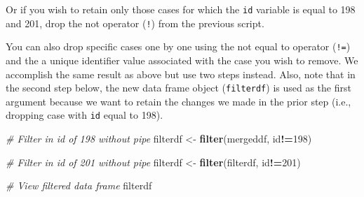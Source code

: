 \documentclass[]{book}
\newenvironment{Shaded}{\begin{snugshade}}{\end{snugshade}}
\newcommand{\KeywordTok}[1]{\textcolor[rgb]{0.13,0.29,0.53}{\textbf{#1}}}
\newcommand{\DecValTok}[1]{\textcolor[rgb]{0.00,0.00,0.81}{#1}}
\newcommand{\StringTok}[1]{\textcolor[rgb]{0.31,0.60,0.02}{#1}}
\newcommand{\CommentTok}[1]{\textcolor[rgb]{0.56,0.35,0.01}{\textit{#1}}}
\newcommand{\OperatorTok}[1]{\textcolor[rgb]{0.81,0.36,0.00}{\textbf{#1}}}
\newcommand{\NormalTok}[1]{#1}
\begin{document}
\begin{Shaded}
\end{Shaded}

Or if you wish to retain only those cases for which the \texttt{id}
variable is equal to 198 and 201, drop the not operator (\texttt{!})
from the previous script.

\begin{Shaded}
\end{Shaded}

You can also drop specific cases one by one using the not equal to
operator (\texttt{!=}) and the a unique identifier value associated with
the case you wish to remove. We accomplish the same result as above but
use two steps instead. Also, note that in the second step below, the new
data frame object (\texttt{filterdf}) is used as the first argument
because we want to retain the changes we made in the prior step (i.e.,
dropping case with \texttt{id} equal to 198).

\begin{Shaded}
\begin{Highlighting}[]
\CommentTok{# Filter in id of 198 without pipe}
\NormalTok{filterdf <-}\StringTok{ }\KeywordTok{filter}\NormalTok{(mergeddf, id}\OperatorTok{!=}\DecValTok{198}\NormalTok{)}

\CommentTok{# Filter in id of 201 without pipe}
\NormalTok{filterdf <-}\StringTok{ }\KeywordTok{filter}\NormalTok{(filterdf, id}\OperatorTok{!=}\DecValTok{201}\NormalTok{)}

\CommentTok{# View filtered data frame}
\NormalTok{filterdf}
\end{Highlighting}
\end{Shaded}
\end{document}
